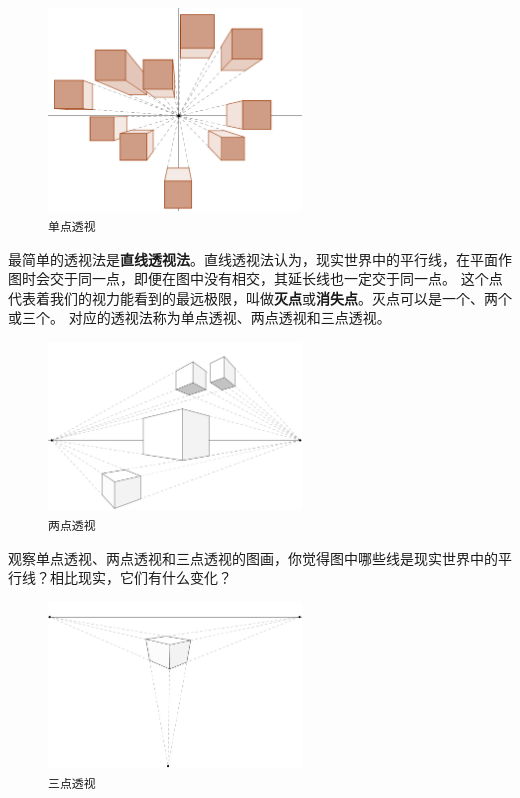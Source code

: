 \documentclass[12pt,UTF8]{ctexbook}
\begin{document}
\begin{figure}[h] %
    \centering
    \includegraphics[width=0.6\textwidth]{单点透视.png}
    \caption*{\texttt{单点透视}}
\end{figure}

最简单的透视法是\textbf{直线透视法}。直线透视法认为，现实世界中的平行线，在平面作图时会交于同一点，即便在图中没有相交，其延长线也一定交于同一点。
这个点代表着我们的视力能看到的最远极限，叫做\textbf{灭点}或\textbf{消失点}。灭点可以是一个、两个或三个。
对应的透视法称为单点透视、两点透视和三点透视。

\begin{figure}[h] %
    \vspace{-4pt}
    \centering
    \includegraphics[width=0.6\textwidth]{两点透视.png}
    \caption*{\texttt{两点透视}}
\end{figure}

观察单点透视、两点透视和三点透视的图画，你觉得图中哪些线是现实世界中的平行线？相比现实，它们有什么变化？

\begin{figure}[h] %
    \vspace{4pt}
    \centering
    \includegraphics[width=0.6\textwidth]{三点透视.png}
    \caption*{\texttt{三点透视}}
\end{figure}
\end{document}
